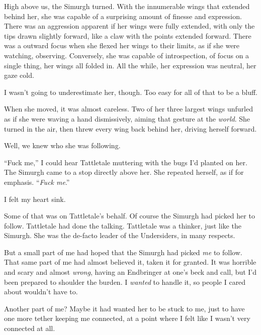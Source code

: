 High above us, the Simurgh turned.  With the innumerable wings that extended behind her, she was capable of a surprising amount of finesse and expression.  There was an aggression apparent if her wings were fully extended, with only the tips drawn slightly forward, like a claw with the points extended forward.  There was a outward focus when she flexed her wings to their limits, as if she were watching, observing.  Conversely, she was capable of introspection, of focus on a single thing, her wings all folded in.  All the while, her expression was neutral, her gaze cold.



I wasn't going to underestimate her, though.  Too easy for all of that to be a bluff.



When she moved, it was almost careless.  Two of her three largest wings unfurled as if she were waving a hand dismissively, aiming that gesture at the \emph{world}.  She turned in the air, then threw every wing back behind her, driving herself forward.



Well, we knew who she was following.



``Fuck me,'' I could hear Tattletale muttering with the bugs I'd planted on her.  The Simurgh came to a stop directly above her.  She repeated herself, as if for emphasis.  ``\emph{Fuck me}.''



I felt my heart sink.



Some of that was on Tattletale's behalf.  Of course the Simurgh had picked her to follow.  Tattletale had done the talking.  Tattletale was a thinker, just like the Simurgh.  She was the de-facto leader of the Undersiders, in many respects.



But a small part of me had hoped that the Simurgh had picked \emph{me} to follow.  That same part of me had almost believed it, taken it for granted.  It was horrible and scary and almost \emph{wrong}, having an Endbringer at one's beck and call, but I'd been prepared to shoulder the burden.  I \emph{wanted} to handle it, so people I cared about wouldn't have to.



Another part of me?  Maybe it had wanted her to be stuck to me, just to have one more tether keeping me connected, at a point where I felt like I wasn't very connected at all.



